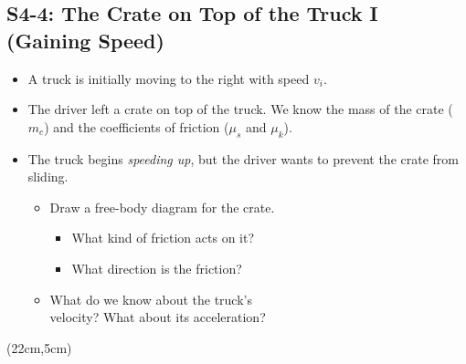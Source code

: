 \documentclass[]{article}
\begin{document}
\begin{PresentSpace}
\vspace{-10pt}
\section*{S4-4: The Crate on Top of the Truck I (Gaining Speed)}
\vspace{-10pt}
\begin{itemize}
	\item A truck is initially moving to the right with speed $v_{i}$.
	\item The driver left a crate on top of the truck. We know the mass of the crate ($m_{c}$) and the coefficients of friction ($\mu_{s}$ and $\mu_{k}$).
	\item The truck begins \textit{speeding up}, but the driver wants to prevent the crate from sliding.
	\begin{itemize}
		\item Draw a free-body diagram for the crate.
		\begin{itemize}
			\item What kind of friction acts on it?
			\item What direction is the friction?
		\end{itemize}
		\item What do we know about the truck's \\
		velocity? What about its acceleration?
	\end{itemize}
\end{itemize}
\end{PresentSpace}
\begin{textblock*}{5cm}(22cm,5cm)
\centering
{}
\end{textblock*}
\newpage
\end{document}
